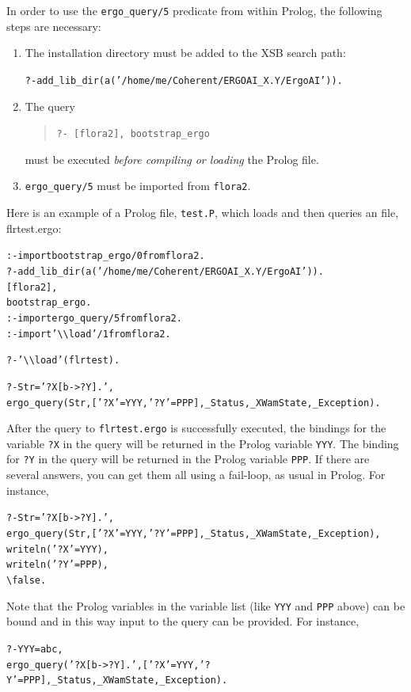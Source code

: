 \documentclass[11pt]{article}
\newcommand{\ERGO}{\mbox{\smaller{\ensuremath{\cal{E}}\smaller{{\sc{RGO}}}}}\xspace}
\newcommand{\FLSYSTEM}{\ERGO}
\newcommand{\FLBOOTSTRAP}{bootstrap\_ergo}
\newcommand{\FLQUERYCMD}{ergo\_query}
\newcommand{\ergoext}{ergo\xspace}
\newcommand{\bs}{\textbackslash}
\begin{document}
In order to use the
\texttt{\FLQUERYCMD/5}
predicate from within Prolog,
the following steps are necessary:
\begin{enumerate}
  \item The \FLSYSTEM installation directory must be added to
    the XSB search path:
\begin{alltt}
 ?- add_lib_dir(a('/home/me/Coherent/ERGOAI_X.Y/ErgoAI')).  
\end{alltt}
  \item The query
    \begin{quote}
      {\tt ?- [flora2], \FLBOOTSTRAP} 
    \end{quote}
    must be executed \emph{before compiling or loading} the Prolog file.
  \item \texttt{\FLQUERYCMD/5}
    must be imported from {\tt flora2}.  
\end{enumerate}
Here is an example of a Prolog file, {\tt test.P}, which loads and then
queries an \FLSYSTEM file, flrtest.\ergoext:
\begin{alltt}
:- import \FLBOOTSTRAP/0 from flora2.
?- add_lib_dir(a('/home/me/Coherent/ERGOAI_X.Y/ErgoAI')).  
   [flora2],
   \FLBOOTSTRAP. 
:- import \FLQUERYCMD/5 from flora2.
:- import '\bs{}\bs{}load'/1 from flora2.

?- '\bs{}\bs{}load'(flrtest).  

?- Str='?X[b->?Y].',
   \FLQUERYCMD(Str,['?X'=YYY,'?Y'=PPP], _Status,_XWamState,_Exception).
\end{alltt}
After the query to {\tt flrtest.\ergoext} is successfully executed, the bindings
for the variable {\tt ?X} in the \FLSYSTEM query will be returned in the Prolog
variable {\tt YYY}. The binding  for {\tt ?Y} in the query will be returned in the
Prolog variable {\tt PPP}. If there are several answers, you can get them
all using a fail-loop, as usual in Prolog. For instance, 
\begin{alltt}
?- Str='?X[b->?Y].',
   \FLQUERYCMD(Str,['?X'=YYY,'?Y'=PPP], _Status,_XWamState,_Exception),
   writeln('?X' = YYY),
   writeln('?Y' = PPP),
   \bs{}false.
\end{alltt}
Note that the Prolog variables in the variable list (like {\tt YYY} and
{\tt PPP} above) can be bound and in this way input to the \FLSYSTEM query  
can be provided. For instance, 
\begin{alltt}
?- YYY=abc,
   \FLQUERYCMD('?X[b->?Y].',['?X'=YYY,'?Y'=PPP],_Status,_XWamState,_Exception).
\end{alltt}
\end{document}

